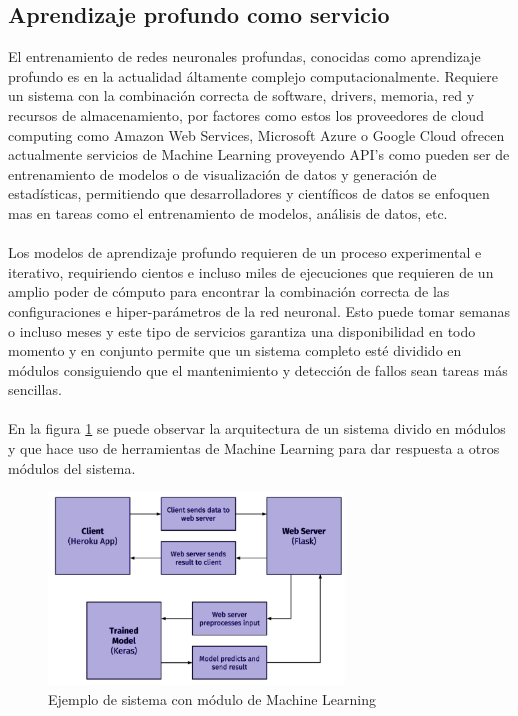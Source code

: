 \subsection{Aprendizaje profundo como servicio}
El entrenamiento de redes neuronales profundas, conocidas como aprendizaje profundo es en la actualidad áltamente complejo computacionalmente. Requiere un sistema con la combinación correcta de software, drivers, memoria, red y recursos de almacenamiento, por factores como estos los proveedores de cloud computing como Amazon Web Services, Microsoft Azure o Google Cloud ofrecen actualmente servicios de Machine Learning proveyendo API's como pueden ser de entrenamiento de modelos o de visualización de datos y generación de estadísticas, permitiendo que desarrolladores y científicos de datos se enfoquen mas en tareas como el entrenamiento de modelos, análisis de datos, etc.
\\\\
Los modelos de aprendizaje profundo requieren de un proceso experimental e iterativo, requiriendo cientos e incluso miles de ejecuciones que requieren de un amplio poder de cómputo para encontrar la combinación correcta de las configuraciones e hiper-parámetros de la red neuronal. Esto puede tomar semanas o incluso meses y este tipo de servicios garantiza una disponibilidad en todo momento y en conjunto permite que un sistema completo esté dividido en módulos consiguiendo que el mantenimiento y detección de fallos sean tareas más sencillas.
\\\\ 
En la figura \ref{fig:DLAAS} se puede observar la arquitectura de un sistema divido en módulos y que hace uso de herramientas de Machine Learning para dar respuesta a otros módulos del sistema.

\begin{figure}[H]
	\centering
	\includegraphics[width=0.7\textwidth]{capitulo2/images/DLAAS.png}
	\caption{Ejemplo de sistema con módulo de Machine Learning}
	\label{fig:DLAAS}
\end{figure}    


